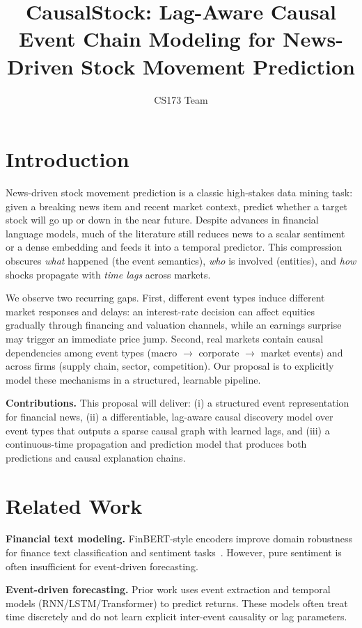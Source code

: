 \documentclass[sigconf,review]{acmart}
\title{CausalStock: Lag-Aware Causal Event Chain Modeling for News-Driven Stock Movement Prediction}
\author{CS173 Team}
\begin{document}
\maketitle

\section{Introduction}
News-driven stock movement prediction is a classic high-stakes data mining task: given a breaking news item and recent market context, predict whether a target stock will go up or down in the near future. Despite advances in financial language models, much of the literature still reduces news to a scalar sentiment or a dense embedding and feeds it into a temporal predictor. This compression obscures \emph{what} happened (the event semantics), \emph{who} is involved (entities), and \emph{how} shocks propagate with \emph{time lags} across markets.

We observe two recurring gaps. First, different event types induce different market responses and delays: an interest-rate decision can affect equities gradually through financing and valuation channels, while an earnings surprise may trigger an immediate price jump. Second, real markets contain causal dependencies among event types (macro \(\rightarrow\) corporate \(\rightarrow\) market events) and across firms (supply chain, sector, competition). Our proposal is to explicitly model these mechanisms in a structured, learnable pipeline.

\textbf{Contributions.} This proposal will deliver: (i) a structured event representation for financial news, (ii) a differentiable, lag-aware causal discovery model over event types that outputs a sparse causal graph with learned lags, and (iii) a continuous-time propagation and prediction model that produces both predictions and causal explanation chains.

\section{Related Work}
\textbf{Financial text modeling.} FinBERT-style encoders improve domain robustness for finance text classification and sentiment tasks~\cite{araci2019finbert}. However, pure sentiment is often insufficient for event-driven forecasting.

\textbf{Event-driven forecasting.} Prior work uses event extraction and temporal models (RNN/LSTM/Transformer) to predict returns. These models often treat time discretely and do not learn explicit inter-event causality or lag parameters.
\end{document}
